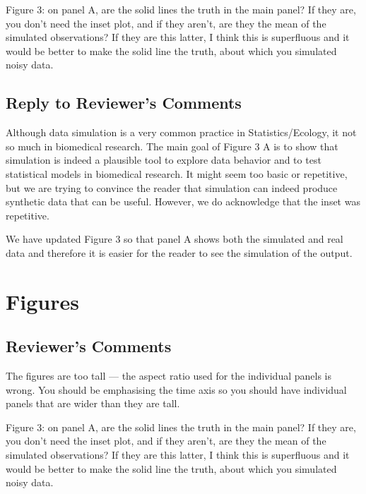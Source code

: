 \documentclass[
]{article}
\begin{document}
Figure 3: on panel A, are the solid lines the truth in the main panel? If they are, you don't need the inset plot, and if they aren't, are they the mean of the simulated observations? If they are this latter, I think this is superfluous and it would be better to make the solid line the truth, about which you simulated noisy data.

\hypertarget{section-16}{%
\subsection{\texorpdfstring{\textcolor{reviewersblue} {Reply to Reviewer's Comments}}{}}\label{section-16}}

Although data simulation is a very common practice in Statistics/Ecology, it not so much in biomedical research. The main goal of Figure 3 A is to show that simulation is indeed a plausible tool to explore data behavior and to test statistical models in biomedical research. It might seem too basic or repetitive, but we are trying to convince the reader that simulation can indeed produce synthetic data that can be useful. However, we do acknowledge that the inset was repetitive.

We have updated Figure 3 so that panel A shows both the simulated and real data and therefore it is easier for the reader to see the simulation of the output.

\hypertarget{figures-1}{%
\section{Figures}\label{figures-1}}

\hypertarget{reviewers-comments-16}{%
\subsection{Reviewer's Comments}\label{reviewers-comments-16}}

The figures are too tall --- the aspect ratio used for the individual panels is wrong. You should be emphasising the time axis so you should have individual panels that are wider than they are tall.

Figure 3: on panel A, are the solid lines the truth in the main panel? If they are, you don't need the inset plot, and if they aren't, are they the mean of the simulated observations? If they are this latter, I think this is superfluous and it would be better to make the solid line the truth, about which you simulated noisy data.
\end{document}
